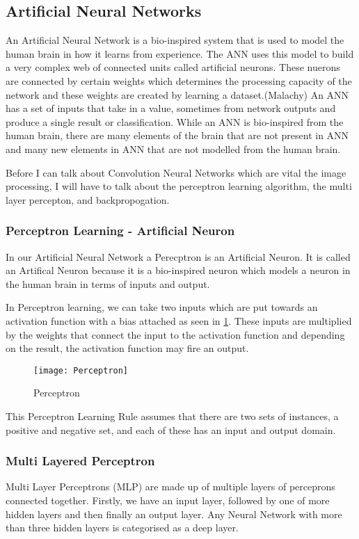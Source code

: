 \subsection{Artificial Neural Networks}
An Artificial Neural Network is a bio-inspired system that is used to model the human brain in how it learns from experience.
The ANN uses this model to build a very complex web of connected units called
artificial neurons.
These nuerons are connected by certain weights which determines the processing
capacity of the network and these weights are created by learning a
dataset.(Malachy)
An ANN has a set of inputs that take in a value, sometimes from network outputs
and produce a single result or classification.
While an ANN is bio-inspired from the human brain, there are many elements of
the brain that are not present in ANN and many new elements in ANN that are not
modelled from the human brain.

Before I can talk about Convolution Neural Networks which are vital the image
processing, I will have to talk about the perceptron learning algorithm, the multi
layer percepton, and backpropogation.

\subsubsection{Perceptron Learning - Artificial Neuron}
In our Artificial Neural Network a Perecptron is an Artificial Neuron.
It is called an Artifical Neuron because it is a bio-inspired neuron which models
a neuron in the human brain in terms of inputs and output.

In Perceptron learning, we can take two inputs which are put towards an
activation function with a bias attached as seen in \ref{fig:perceptron}.
These inputs are multiplied by the weights that connect the input to the
activation function and depending on the result, the activation function may
fire an output.

\begin{figure}
     \texttt{[image: Perceptron]}
     \caption{Perceptron}
     \label{fig:perceptron}
\end{figure}

This Perceptron Learning Rule assumes that there are two sets of instances, a
positive and negative set, and each of these has an input and output domain.

\subsubsection{Multi Layered Perceptron}
Multi Layer Perceptrons (MLP) are made up of multiple layers of perceprons connected
together.
Firstly, we have an input layer, followed by one of more hidden layers and then
finally an output layer.
Any Neural Network with more than three hidden layers is categorised as a deep
layer.

